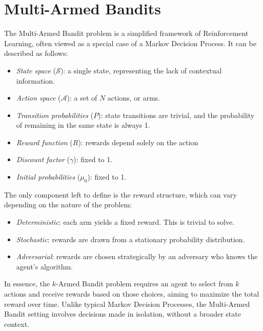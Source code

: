\section{Multi-Armed Bandits}

The Multi-Armed Bandit problem is a simplified framework of Reinforcement Learning, often viewed as a special case of a Markov Decision Process. 
It can be described as follows:
\begin{itemize}
    \item \textit{State space} ($\mathcal{S}$): a single state, representing the lack of contextual information.
    \item \textit{Action space} ($\mathcal{A}$): a set of $N$ actions, or arms. 
    \item \textit{Transition probabilities} ($P$): state transitions are trivial, and the probability of remaining in the same state is always 1. 
    \item \textit{Reward function} ($R$): rewards depend solely on the action
    \item \textit{Discount factor} ($\gamma$): fixed to 1. 
    \item \textit{Initial probabilities} ($\mu_0$): fixed to 1. 
\end{itemize}
\noindent The only component left to define is the reward structure, which can vary depending on the nature of the problem:
\begin{itemize}
    \item \textit{Deterministic}: each arm yields a fixed reward. 
        This is trivial to solve.
    \item \textit{Stochastic}: rewards are drawn from a stationary probability distribution.
    \item \textit{Adversarial}: rewards are chosen strategically by an adversary who knows the agent's algorithm.
\end{itemize}
In essence, the $k$-Armed Bandit problem requires an agent to select from $k$ actions and receive rewards based on those choices, aiming to maximize the total reward over time. 
Unlike typical Markov Decision Processes, the Multi-Armed Bandit setting involves decisions made in isolation, without a broader state context.

